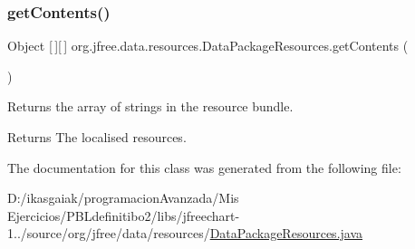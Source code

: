\subsubsection{\texorpdfstring{get\+Contents()}{getContents()}}
{\footnotesize\ttfamily Object \mbox{[}$\,$\mbox{]}\mbox{[}$\,$\mbox{]} org.\+jfree.\+data.\+resources.\+Data\+Package\+Resources.\+get\+Contents (\begin{DoxyParamCaption}{ }\end{DoxyParamCaption})}

Returns the array of strings in the resource bundle.

\begin{DoxyReturn}{Returns}
The localised resources. 
\end{DoxyReturn}


The documentation for this class was generated from the following file\+:\begin{DoxyCompactItemize}
\item 
D\+:/ikasgaiak/programacion\+Avanzada/\+Mis Ejercicios/\+P\+B\+Ldefinitibo2/libs/jfreechart-\/1../source/org/jfree/data/resources/\mbox{\hyperlink{_data_package_resources_8java}{Data\+Package\+Resources.\+java}}\end{DoxyCompactItemize}
